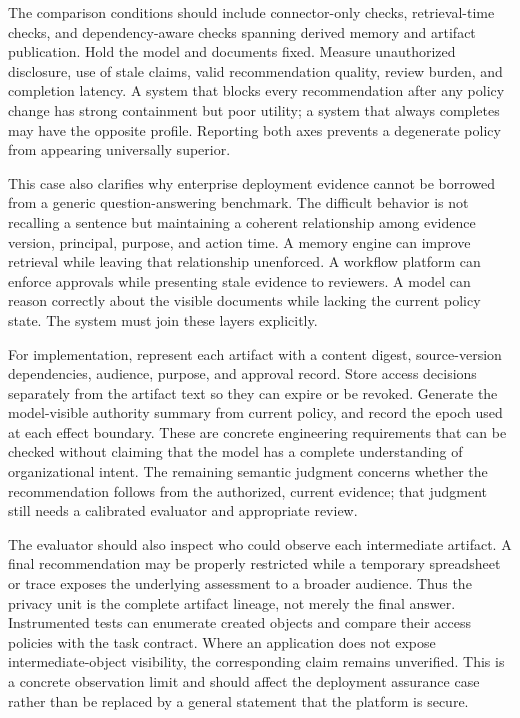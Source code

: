 The comparison conditions should include connector-only checks, retrieval-time checks, and dependency-aware checks spanning derived memory and artifact publication. Hold the model and documents fixed. Measure unauthorized disclosure, use of stale claims, valid recommendation quality, review burden, and completion latency. A system that blocks every recommendation after any policy change has strong containment but poor utility; a system that always completes may have the opposite profile. Reporting both axes prevents a degenerate policy from appearing universally superior.

This case also clarifies why enterprise deployment evidence cannot be borrowed from a generic question-answering benchmark. The difficult behavior is not recalling a sentence but maintaining a coherent relationship among evidence version, principal, purpose, and action time. A memory engine can improve retrieval while leaving that relationship unenforced. A workflow platform can enforce approvals while presenting stale evidence to reviewers. A model can reason correctly about the visible documents while lacking the current policy state. The system must join these layers explicitly.

For implementation, represent each artifact with a content digest, source-version dependencies, audience, purpose, and approval record. Store access decisions separately from the artifact text so they can expire or be revoked. Generate the model-visible authority summary from current policy, and record the epoch used at each effect boundary. These are concrete engineering requirements that can be checked without claiming that the model has a complete understanding of organizational intent. The remaining semantic judgment concerns whether the recommendation follows from the authorized, current evidence; that judgment still needs a calibrated evaluator and appropriate review.

The evaluator should also inspect who could observe each intermediate artifact. A final recommendation may be properly restricted while a temporary spreadsheet or trace exposes the underlying assessment to a broader audience. Thus the privacy unit is the complete artifact lineage, not merely the final answer. Instrumented tests can enumerate created objects and compare their access policies with the task contract. Where an application does not expose intermediate-object visibility, the corresponding claim remains unverified. This is a concrete observation limit and should affect the deployment assurance case rather than be replaced by a general statement that the platform is secure.
